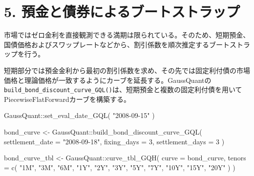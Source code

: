 \documentclass[
  letterpaper,
  DIV=11,
  numbers=noendperiod]{scrreprt}
\newenvironment{Shaded}{\begin{snugshade}}{\end{snugshade}}
\newcommand{\AttributeTok}[1]{\textcolor[rgb]{0.40,0.45,0.13}{#1}}
\newcommand{\DecValTok}[1]{\textcolor[rgb]{0.68,0.00,0.00}{#1}}
\newcommand{\FunctionTok}[1]{\textcolor[rgb]{0.28,0.35,0.67}{#1}}
\newcommand{\NormalTok}[1]{\textcolor[rgb]{0.00,0.23,0.31}{#1}}
\newcommand{\OtherTok}[1]{\textcolor[rgb]{0.00,0.23,0.31}{#1}}
\newcommand{\SpecialCharTok}[1]{\textcolor[rgb]{0.37,0.37,0.37}{#1}}
\newcommand{\StringTok}[1]{\textcolor[rgb]{0.13,0.47,0.30}{#1}}
\begin{document}
\section{5.
預金と債券によるブートストラップ}\label{ux9810ux91d1ux3068ux50b5ux5238ux306bux3088ux308bux30d6ux30fcux30c8ux30b9ux30c8ux30e9ux30c3ux30d7}

市場ではゼロ金利を直接観測できる満期は限られている。そのため、短期預金、国債価格およびスワップレートなどから、割引係数を順次推定するブートストラップを行う。

短期部分では預金金利から最初の割引係数を求め、その先では固定利付債の市場価格と理論価格が一致するようにカーブを延長する。GaussQuantの\texttt{build\_bond\_discount\_curve\_GQL()}は、短期預金と複数の固定利付債を用いてPiecewiseFlatForwardカーブを構築する。

\begin{Shaded}
\begin{Highlighting}[]
\NormalTok{GaussQuant}\SpecialCharTok{::}\FunctionTok{set\_eval\_date\_GQL}\NormalTok{(}
  \StringTok{"2008{-}09{-}15"}
\NormalTok{)}

\NormalTok{bond\_curve }\OtherTok{\textless{}{-}}\NormalTok{ GaussQuant}\SpecialCharTok{::}\FunctionTok{build\_bond\_discount\_curve\_GQL}\NormalTok{(}
  \AttributeTok{settlement\_date =} \StringTok{"2008{-}09{-}18"}\NormalTok{,}
  \AttributeTok{fixing\_days =} \DecValTok{3}\NormalTok{,}
  \AttributeTok{settlement\_days =} \DecValTok{3}
\NormalTok{)}

\NormalTok{bond\_curve\_tbl }\OtherTok{\textless{}{-}}\NormalTok{ GaussQuant}\SpecialCharTok{::}\FunctionTok{curve\_tbl\_GQH}\NormalTok{(}
  \AttributeTok{curve =}\NormalTok{ bond\_curve,}
  \AttributeTok{tenors =} \FunctionTok{c}\NormalTok{(}
    \StringTok{"1M"}\NormalTok{, }\StringTok{"3M"}\NormalTok{, }\StringTok{"6M"}\NormalTok{, }\StringTok{"1Y"}\NormalTok{,}
    \StringTok{"2Y"}\NormalTok{, }\StringTok{"3Y"}\NormalTok{, }\StringTok{"5Y"}\NormalTok{, }\StringTok{"7Y"}\NormalTok{,}
    \StringTok{"10Y"}\NormalTok{, }\StringTok{"15Y"}\NormalTok{, }\StringTok{"20Y"}
\NormalTok{  )}
\NormalTok{)}


\end{Highlighting}
\end{Shaded}
\end{document}

